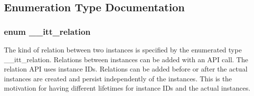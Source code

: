 \subsection{Enumeration Type Documentation}
\hypertarget{group__relations_ga2f588e0d778ac0cca7cc0b64cfb1bdca}{
\subsubsection[{\-\_\-\-\_\-itt\-\_\-relation}]{\setlength{\rightskip}{0pt plus 5cm}enum {\bf \-\_\-\-\_\-itt\-\_\-relation}}}\label{group__relations_ga2f588e0d778ac0cca7cc0b64cfb1bdca}


The kind of relation between two instances is specified by the enumerated type \-\_\-\-\_\-itt\-\_\-relation. Relations between instances can be added with an A\-P\-I call. The relation A\-P\-I uses instance I\-Ds. Relations can be added before or after the actual instances are created and persist independently of the instances. This is the motivation for having different lifetimes for instance I\-Ds and the actual instances. 

